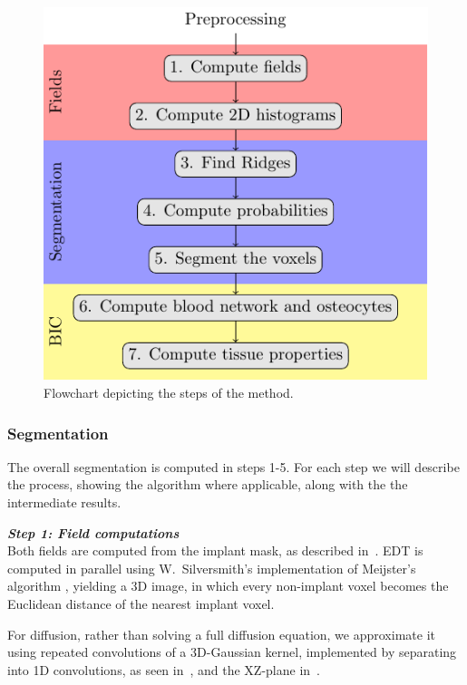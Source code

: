 \documentclass[pdflatex,sn-mathphys]{sn-jnl}%
\theoremstyle{thmstyleone}%
\theoremstyle{thmstyletwo}%
\theoremstyle{thmstylethree}%
\begin{document}
\begin{figure}
  \centering
  \includegraphics{steps}
    \caption{Flowchart depicting the steps of the method.}
    \label{fig:flowchart}
\end{figure}

\subsubsection{Segmentation}
The overall segmentation is computed in steps 1-5. For each step we will describe the process, showing
the algorithm where applicable, along with the the intermediate results.

\vspace{\baselineskip}
\noindent\textit{\textbf{Step 1: Field computations}}\\
Both fields are computed from the implant mask, as described in~.
EDT is computed in parallel using W.~Silversmith's implementation of Meijster's algorithm \cite{pypi-edt},
yielding a 3D image, in which every non-implant voxel becomes the Euclidean distance of the nearest implant voxel.

For diffusion, rather than solving a full diffusion equation, we approximate it using repeated convolutions
of a 3D-Gaussian kernel, implemented by separating into 1D convolutions, as seen in~, and the XZ-plane in~.
\end{document}
